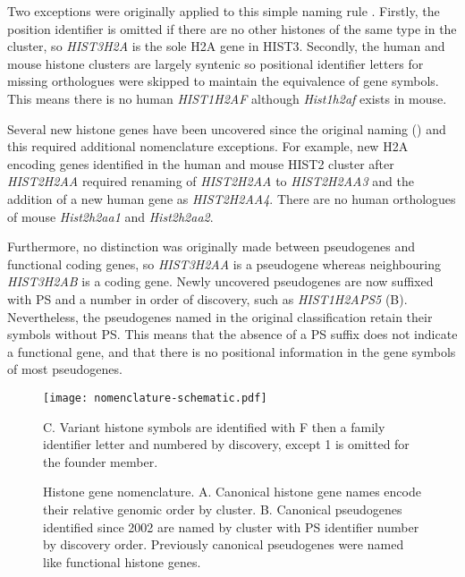 	Two exceptions were originally applied to this simple naming rule \citep{Marzluff02}. 
	Firstly, the position identifier is omitted if there are no other histones of the same type in the cluster, 
	so \textit{HIST3H2A} is the sole H2A gene in HIST3. 
	Secondly, the human and mouse histone clusters are largely syntenic 
	so positional identifier letters for missing orthologues were skipped to maintain the equivalence of gene symbols.
	This means there is no human \textit{HIST1H2AF} although \textit{Hist1h2af} exists in mouse.

	Several new histone genes have been uncovered since the original naming () 
	and this required additional nomenclature exceptions.
	For example, new H2A encoding genes identified in the human and mouse HIST2 cluster after \textit{HIST2H2AA} 
	required renaming of \textit{HIST2H2AA} to \textit{HIST2H2AA3} 
	and the addition of a new human gene as \textit{HIST2H2AA4}. 
	There are no human orthologues of mouse \textit{Hist2h2aa1} and \textit{Hist2h2aa2}.

	Furthermore, no distinction was originally made between pseudogenes and functional coding genes,
	so \textit{HIST3H2AA} is a pseudogene whereas neighbouring \textit{HIST3H2AB} is a coding gene.
	Newly uncovered pseudogenes are now suffixed with PS and a number in order of discovery,
	such as \textit{HIST1H2APS5} (B). 
	Nevertheless, the pseudogenes named in the original classification retain their symbols without PS.
	This means that the absence of a PS suffix does not indicate a functional gene, 
	and that there is no positional information in the gene symbols of most pseudogenes.

    \begin{figure*}[hp]
      \centering
      \texttt{[image: nomenclature-schematic.pdf]}
      \caption{Histone gene nomenclature. 
	  A. Canonical histone gene names encode their relative genomic order by cluster. 
	  B. Canonical pseudogenes identified since 2002 are named by cluster 
	  with PS identifier number by discovery order. 
	  Previously canonical pseudogenes were named like functional histone genes.}
	  C. Variant histone symbols are identified with F then a family identifier letter
	  and numbered by discovery, except 1 is omitted for the founder member.
      \label{fig:nomenclature}
    \end{figure*}

